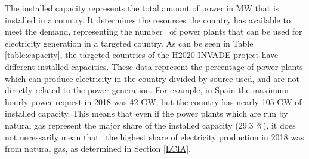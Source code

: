 {The installed capacity represents the total amount of power in MW that is installed in a country. It determines the  resources the country has available to meet the demand, representing the {number}%
~of power plants that can be used for electricity generation in a targeted country. 
As can be seen in  Table \ref{table:capacity}, the targeted countries of the H2020 INVADE project have different  installed capacities. These data represent the percentage of power plants which can produce electricity in the country divided by source used, and are not directly related to the power generation. For example, in Spain the maximum hourly power request in 2018 was 42 GW, but the country has nearly 105 GW of installed capacity. This means that even if the power plants which are run by natural gas represent the major share of the installed capacity (29.3 \%), it does not necessarily{ mean that}%
~the highest share of electricity production in 2018 was from natural gas, as determined in Section \ref{LCIA}.

}
